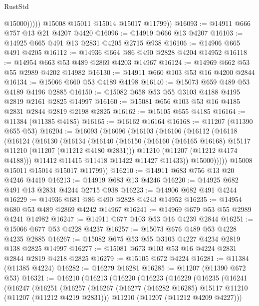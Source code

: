 \begin{lexlean}{RustStd}
\begin{coremodule}
                  @15000)))))
        @15008
        @15011
        @15014
        @15017
        @11799))
@16093 := @14911 @666 @757 @13 @21 @4207 @4420
@16096 := @14919 @666 @13 @4207
@16103 := @14925 @665 @491 @13 @2831 @4205 @2715 @938
@16106 := @14906 @665 @491 @4205
@16112 := @14936 @664 @86 @490 @2828 @4204 @14952
@16118 := @14954 @663 @53 @489 @2869 @4203 @14967
@16124 := @14969 @662 @53 @55 @2989 @4202 @14982
@16130 := @14911 @660 @103 @53 @16 @4200 @2844
@16134 := @15066 @660 @53 @4189 @4198
@16140 := @15073 @659 @489 @53 @4189 @4196 @2885
@16150 := @15082 @658 @53 @55 @3103 @4188 @4195 @2819 @2161 @2825 @14997
@16160 := @15081 @656 @103 @53 @16 @4185 @2831 @2844 @2819 @2198 @2825
@16162 := @15105 @655 @4185
@16164 := @11384 (@11385 @4185)
@16165 := @16162 @16164
@16168 := @11207 (@11390 @655 @53)
@16204 := @16093
    (@16096
      (@16103
        (@16106
          (@16112
            (@16118
              (@16124
                (@16130
                  (@16134
                    (@16140
                      (@16150
                        (@16160 (@16165 @16168) @15117 @11210 (@11207 (@11212 @4180 @2831)))
                        @11210
                        (@11207 (@11212 @4174 @4188)))
                      @11412
                      @11415
                      @11418
                      @11422
                      @11427
                      @11433))
                  @15000)))))
        @15008
        @15011
        @15014
        @15017
        @11799))
@16210 := @14911 @683 @756 @13 @20 @4246 @4419
@16213 := @14919 @683 @13 @4246
@16220 := @14925 @682 @491 @13 @2831 @4244 @2715 @938
@16223 := @14906 @682 @491 @4244
@16229 := @14936 @681 @86 @490 @2828 @4243 @14952
@16235 := @14954 @680 @53 @489 @2869 @4242 @14967
@16241 := @14969 @679 @53 @55 @2989 @4241 @14982
@16247 := @14911 @677 @103 @53 @16 @4239 @2844
@16251 := @15066 @677 @53 @4228 @4237
@16257 := @15073 @676 @489 @53 @4228 @4235 @2885
@16267 := @15082 @675 @53 @55 @3103 @4227 @4234 @2819 @138 @2825 @14997
@16277 := @15081 @673 @103 @53 @16 @4224 @2831 @2844 @2819 @4218 @2825
@16279 := @15105 @672 @4224
@16281 := @11384 (@11385 @4224)
@16282 := @16279 @16281
@16285 := @11207 (@11390 @672 @53)
@16321 := @16210
    (@16213
      (@16220
        (@16223
          (@16229
            (@16235
              (@16241
                (@16247
                  (@16251
                    (@16257
                      (@16267
                        (@16277 (@16282 @16285) @15117 @11210 (@11207 (@11212 @4219 @2831)))
                        @11210
                        (@11207 (@11212 @4209 @4227)))

\end{coremodule}
\end{lexlean}
